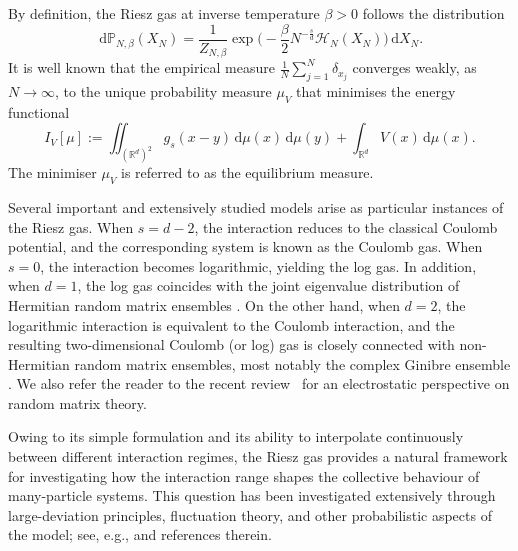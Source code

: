 \documentclass{amsart}
\def\R{\mathbb{R}}
\newcommand{\ud}{\, \mathrm{d}}
\theoremstyle{plain}
\theoremstyle{remark}
\numberwithin{equation}{section}
\begin{document}
  

By definition, the Riesz gas at inverse temperature $\beta>0$ follows the distribution 
\begin{equation} \label{def of Riesz gas Gibbs}
\ud \mathbb{P}_{N,\beta}(X_N) = \frac{1}{Z_{N,\beta}} \exp\Big(-\frac{\beta}{2} N^{-\frac{s}{d}} \mathcal{H}_N(X_N) \Big) \ud X_N. 
\end{equation} 
It is well known that the empirical measure $\frac{1}{N} \sum_{j=1}^N \delta_{x_j}$ converges weakly, as $N\to\infty$, to the unique probability measure $\mu_V$ that minimises the energy functional
\begin{equation} \label{def of energy functional}
I_V[\mu] := \iint_{ (\R^d)^2} g_s(x-y) \ud\mu(x)\ud\mu(y) + \int_{ \R^d } V(x) \ud\mu(x).   
\end{equation}
The minimiser $\mu_V$ is referred to as the equilibrium measure. 

Several important and extensively studied models arise as particular
instances of the Riesz gas. When \(s=d-2\), the interaction reduces to
the classical Coulomb potential, and the corresponding system is known
as the Coulomb gas. When \(s=0\), the interaction becomes logarithmic,
yielding the log gas. In addition, when $d=1$, the log gas coincides with the joint eigenvalue distribution of Hermitian random matrix ensembles 
\cite{Fo10}. On the other hand, when $d=2$, the logarithmic interaction is
equivalent to the Coulomb interaction, and the resulting two-dimensional
Coulomb (or log) gas is closely connected with non-Hermitian random
matrix ensembles, most notably the complex Ginibre ensemble
\cite{BF25}. We also refer the reader to the recent review~\cite{BF25a} for an electrostatic perspective on random matrix theory.

 

\smallskip 
 
Owing to its simple formulation and its ability to interpolate
continuously between different interaction regimes, the Riesz gas
provides a natural framework for investigating how the interaction
range shapes the collective behaviour of many-particle systems. This
question has been investigated extensively through large-deviation
principles, fluctuation theory, and other probabilistic aspects of the model; see, e.g., \cite{Se24,HLSS18,LS17,LS25,LS25a} and references therein. 
\end{document}
